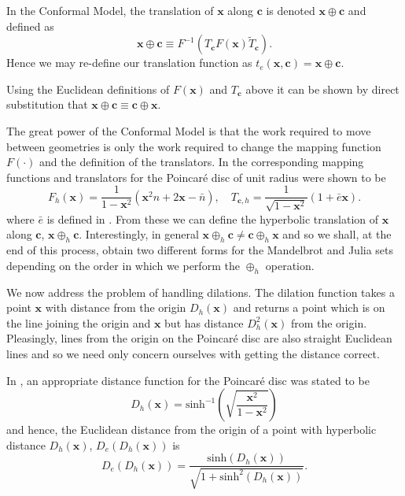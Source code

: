 \documentclass{elsart}
\theoremstyle{definition}
\begin{document}
In the Conformal Model, the translation of $\mathbf{x}$ along $\mathbf{c}$ is
denoted $\mathbf{x} \oplus \mathbf{c}$ and defined as
\begin{equation}
\mathbf{x} \oplus \mathbf{c} \equiv F^{-1}(T_\mathbf{c}
  F(\mathbf{x}) \tilde{T}_\mathbf{c}).
\end{equation}
Hence we may re-define our translation function as $t_e(\mathbf{x}, \mathbf{c})
= \mathbf{x} \oplus \mathbf{c}$.

Using the Euclidean definitions of $F(\mathbf{x})$ and $T_\mathbf{c}$ above
it can be shown by direct substitution that $\mathbf{x} \oplus \mathbf{c} \equiv
\mathbf{c} \oplus \mathbf{x}$.

The great power of the Conformal Model is that the work required to
move between geometries is only the work required to change the mapping function
$F(\cdot)$ and the definition of the translators. In \cite{WarehamThesis} the
corresponding mapping functions and translators for the Poincar\'e disc of
unit radius were shown to be
\begin{equation}
F_h(\mathbf{x}) = \frac{1}{1 - \mathbf{x}^2} (\mathbf{x}^2n + 2\mathbf{x} - \bar{n}),
\quad
T_{\mathbf{c},h} = \frac{1}{\sqrt{1 - \mathbf{x}^2}} (1 + \bar{e} \mathbf{x}).
\end{equation}
where $\bar{e}$ is defined in \cite{WarehamThesis}.
From these we can define the hyperbolic translation of $\mathbf{x}$ along
$\mathbf{c}$, $\mathbf{x} \oplus_h \mathbf{c}$. Interestingly, in general
$\mathbf{x} \oplus_h \mathbf{c} \ne \mathbf{c} \oplus_h \mathbf{x}$ and so we
shall, at the end of this process, obtain two different forms for the
Mandelbrot and Julia sets depending on the order in which we perform the
$\oplus_h$ operation. 

We now address the problem of handling dilations. The dilation function
takes a point $\mathbf{x}$ with distance from the origin $D_h(\mathbf{x})$ and
returns a point which is on the line joining the origin and $\mathbf{x}$
but has distance $D^2_h(\mathbf{x})$ from the origin. Pleasingly, lines from the
origin on the Poincar\'e disc are also straight Euclidean lines and so we
need only concern ourselves with getting the distance correct.

In \cite{WarehamThesis}, an appropriate distance function for the Poincar\'e
disc was stated to be
\begin{equation}
D_h(\mathbf{x}) = \mathrm{sinh}^{-1}\left(\sqrt{
\frac{\mathbf{x}^2}{1 - \mathbf{x}^2}
}\right)
\end{equation}
and hence, the Euclidean distance from the origin of a point with
hyperbolic distance $D_h(\mathbf{x})$, $D_e(D_h(\mathbf{x}))$ is
\begin{equation}
D_e(D_h(\mathbf{x})) = \frac{
\mathrm{sinh}(D_h(\mathbf{x}))
}{
\sqrt{1 + \mathrm{sinh}^2(D_h(\mathbf{x}))}
}.
\end{equation}
\end{document}
